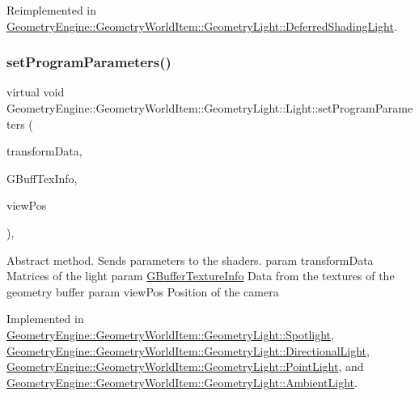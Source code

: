Reimplemented in \mbox{\hyperlink{class_geometry_engine_1_1_geometry_world_item_1_1_geometry_light_1_1_deferred_shading_light_a2071d92505a56dfb846b87c2aca9b94b}{Geometry\+Engine\+::\+Geometry\+World\+Item\+::\+Geometry\+Light\+::\+Deferred\+Shading\+Light}}.

\mbox{\label{class_geometry_engine_1_1_geometry_world_item_1_1_geometry_light_1_1_light_a366be5945389fe58df4bf5aa8c43138f}} 
\subsubsection{\texorpdfstring{setProgramParameters()}{setProgramParameters()}}
{\footnotesize\ttfamily virtual void Geometry\+Engine\+::\+Geometry\+World\+Item\+::\+Geometry\+Light\+::\+Light\+::set\+Program\+Parameters (\begin{DoxyParamCaption}\item[{const \mbox{\hyperlink{struct_geometry_engine_1_1_lighting_transformation_data}{Lighting\+Transformation\+Data}} \&}]{transform\+Data,  }\item[{const \mbox{\hyperlink{struct_geometry_engine_1_1_g_buffer_texture_info}{G\+Buffer\+Texture\+Info}} \&}]{G\+Buff\+Tex\+Info,  }\item[{const Q\+Vector3D \&}]{view\+Pos }\end{DoxyParamCaption})\hspace{0.3cm}{\ttfamily [protected]}, {}}

Abstract method. Sends parameters to the shaders. param transform\+Data Matrices of the light param \mbox{\hyperlink{struct_geometry_engine_1_1_g_buffer_texture_info}{G\+Buffer\+Texture\+Info}} Data from the textures of the geometry buffer param view\+Pos Position of the camera 

Implemented in \mbox{\hyperlink{class_geometry_engine_1_1_geometry_world_item_1_1_geometry_light_1_1_spotlight_a89686934756cc47dd810cc43d8f5f88a}{Geometry\+Engine\+::\+Geometry\+World\+Item\+::\+Geometry\+Light\+::\+Spotlight}}, \mbox{\hyperlink{class_geometry_engine_1_1_geometry_world_item_1_1_geometry_light_1_1_directional_light_ae395d609ee47dd5d399514bb2c76d2db}{Geometry\+Engine\+::\+Geometry\+World\+Item\+::\+Geometry\+Light\+::\+Directional\+Light}}, \mbox{\hyperlink{class_geometry_engine_1_1_geometry_world_item_1_1_geometry_light_1_1_point_light_acf3ebd411b36d95ba26ae41bcc25793a}{Geometry\+Engine\+::\+Geometry\+World\+Item\+::\+Geometry\+Light\+::\+Point\+Light}}, and \mbox{\hyperlink{class_geometry_engine_1_1_geometry_world_item_1_1_geometry_light_1_1_ambient_light_a37469f72317d3d9cd0e5fb46fbf5fedf}{Geometry\+Engine\+::\+Geometry\+World\+Item\+::\+Geometry\+Light\+::\+Ambient\+Light}}.



